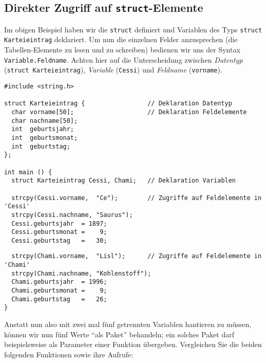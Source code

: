 
\subsection{Direkter Zugriff auf \texttt{struct}-Elemente}
Im obigen Beispiel haben wir die \texttt{struct} definiert und Variablen des Typs \texttt{struct Karteieintrag} deklariert. Um nun die einzelnen Felder anzusprechen (\ie die Tabellen-Elemente zu lesen und zu schreiben) bedienen wir uns der Syntax \texttt{Variable.Feldname}. Achten hier auf die Unterscheidung zwischen \emph{Datentyp} (\eg \texttt{struct Karteieintrag}), \emph{Variable} (\eg \texttt{Cessi}) und \emph{Feldname} (\eg \texttt{vorname}).

\begin{codebox}
\begin{verbatim}
#include <string.h>

struct Karteieintrag {                 // Deklaration Datentyp
  char vorname[50];                    // Deklaration Feldelemente
  char nachname[50];
  int  geburtsjahr;
  int  geburtsmonat;
  int  geburtstag;
};

int main () {
  struct Karteieintrag Cessi, Chami;   // Deklaration Variablen

  strcpy(Cessi.vorname,  "Ce");        // Zugriffe auf Feldelemente in 'Cessi'
  strcpy(Cessi.nachname, "Saurus");
  Cessi.geburtsjahr  = 1897;
  Cessi.geburtsmonat =    9;
  Cessi.geburtstag   =   30;
\end{verbatim}
\end{codebox}
\begin{codebox}[]
\begin{verbatim}
  strcpy(Chami.vorname,  "Lisl");      // Zugriffe auf Feldelemente in 'Chami'
  strcpy(Chami.nachname, "Kohlenstoff");
  Chami.geburtsjahr  = 1996;
  Chami.geburtsmonat =    9;
  Chami.geburtstag   =   26;
}
\end{verbatim}
\end{codebox}

Anstatt nun also mit zwei mal fünf getrennten Variablen hantieren zu müssen, können wir nun fünf Werte \enquote{als Paket} behandeln; ein solches Paket darf beispielsweise als Parameter einer Funktion übergeben. Vergleichen Sie die beiden folgenden Funktionen sowie ihre Aufrufe:

